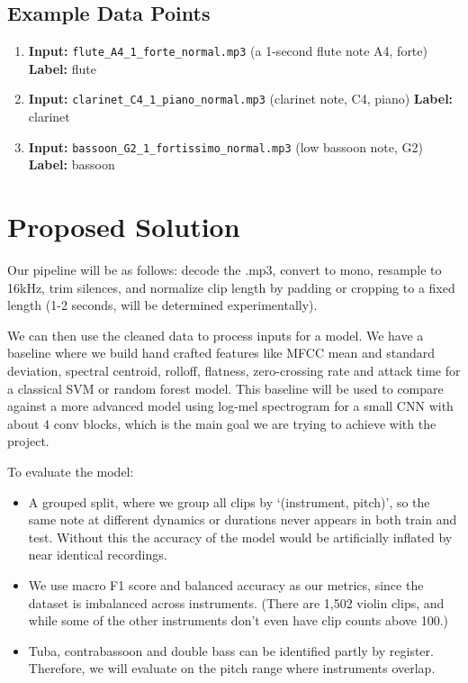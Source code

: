 \documentclass[12pt]{article}
\begin{document}
\subsection*{Example Data Points}
\begin{enumerate}
    \item \textbf{Input:} \texttt{flute\_A4\_1\_forte\_normal.mp3} (a 1-second flute note A4, forte) \quad \textbf{Label:} flute
    \item \textbf{Input:} \texttt{clarinet\_C4\_1\_piano\_normal.mp3} (clarinet note, C4, piano) \quad \textbf{Label:} clarinet
    \item \textbf{Input:} \texttt{bassoon\_G2\_1\_fortissimo\_normal.mp3} (low bassoon note, G2) \quad \textbf{Label:} bassoon
\end{enumerate}
\section{Proposed Solution}
Our pipeline will be as follows: decode the .mp3, convert to mono, resample to 16kHz, trim silences, and normalize clip length by padding or cropping to a fixed length (1-2 seconds, will be determined experimentally). 

We can then use the cleaned data to process inputs for a model. We have a baseline where we build hand crafted features like MFCC mean and standard deviation, spectral centroid, rolloff, flatness, zero-crossing rate and attack time for a classical SVM or random forest model. This baseline will be used to compare against a more advanced model using log-mel spectrogram for a small CNN with about 4 conv blocks, which is the main goal we are trying to achieve with the project. 

To evaluate the model:
\begin{itemize}
    \item A grouped split, where we group all clips by `(instrument, pitch)', so the same note at different dynamics or durations never appears in both train and test. Without this the accuracy of the model would be artificially inflated by near identical recordings.
    \item We use macro F1 score and balanced accuracy as our metrics, since the dataset is imbalanced across instruments. (There are 1,502 violin clips, and while some of the other instruments don't even have clip counts above 100.)
    \item Tuba, contrabassoon and double bass can be identified partly by register. Therefore, we will evaluate on the pitch range where instruments overlap.
\end{itemize}
\end{document}
